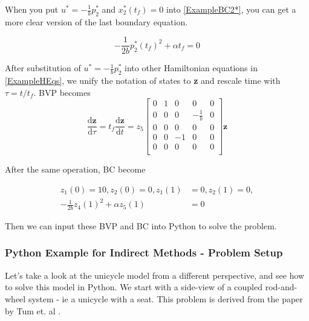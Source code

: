 \documentclass[twoside]{article}
\begin{document}
When you put $u^* = -\frac{1}{b}p_2^*$ and $x_2^*(t_f) = 0$ into \eqref{ExampleBC2*}, you can get a more clear version of the last boundary equation.

\begin{equation}\label{ExampleBC2*Clear}
-\frac{1}{2b}p_2^*(t_f)^2 + \alpha t_f = 0
\end{equation}

After substitution of $u^* = -\frac{1}{b}p_2^*$ into other Hamiltonian equations in \eqref{ExampleHEqs}, we unify the notation of states to \textbf{z} and rescale time with $\tau = t/t_f$. BVP becomes
\begin{equation}\label{FinalBVP}
\frac{\mathrm{d}\textbf{z}}{\mathrm{d}\tau} = t_f\frac{\mathrm{d}\textbf{z}}{\mathrm{d}t}
= z_5\begin{bmatrix}
    0 & 1 & 0  & 0                & 0 \\
    0 & 0 & 0  & -\frac{1}{b} & 0 \\
    0 & 0 & 0  & 0                & 0 \\
    0 & 0 & -1 & 0                & 0 \\
    0 & 0 & 0  & 0                & 0 \\
\end{bmatrix} \textbf{z}
\end{equation}

After the same operation, BC become

\begin{equation}\label{FinalBC}
\begin{split}
z_1(0) = 10, z_2(0) = 0, z_1(1) &= 0, z_2(1) = 0, \\
-\frac{1}{2b}z_4(1)^2 + \alpha z_5(1) &= 0
\end{split}
\end{equation}

Then we can input these BVP and BC into Python to solve the problem.

\subsubsection{Python Example for Indirect Methods - Problem Setup}

Let's take a look at the unicycle model from a different perspective, and see how to solve this model in Python. We start with a side-view of a coupled rod-and-wheel system - ie a unicycle with a seat. This problem is derived from the paper by Tum et. al \cite{inverse_pendulum}.
\end{document}
